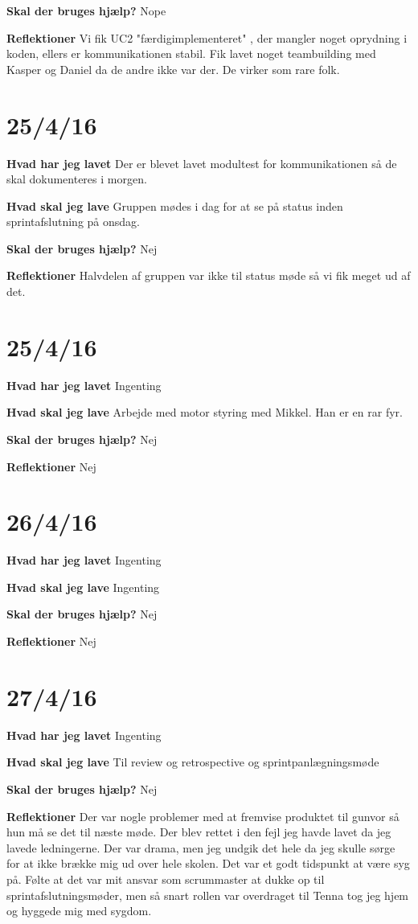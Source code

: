 \documentclass{article}
\begin{document}
	\textbf{Skal der bruges hjælp?}
	Nope
	
	\textbf{Reflektioner}
	Vi fik UC2 "færdigimplementeret" , der mangler noget oprydning i koden, ellers er kommunikationen stabil. Fik lavet noget teambuilding med Kasper og Daniel da de andre ikke var der. De virker som rare folk. 
	
	\section{25/4/16}
	\textbf{Hvad har jeg lavet}
	Der er blevet lavet modultest for kommunikationen så de skal dokumenteres i morgen. 
	
	\textbf{Hvad skal jeg lave}
	Gruppen mødes i dag for at se på status inden sprintafslutning på onsdag. 
	
	\textbf{Skal der bruges hjælp?}
	Nej

	
	\textbf{Reflektioner}
	Halvdelen af gruppen var ikke til status møde så vi fik meget ud af det.
	
	\section{25/4/16}
	\textbf{Hvad har jeg lavet}
	Ingenting
	
	\textbf{Hvad skal jeg lave}
	Arbejde med motor styring med Mikkel. Han er en rar fyr. 
	
	\textbf{Skal der bruges hjælp?}
	Nej
	
	
	\textbf{Reflektioner}
	Nej
	
	\section{26/4/16}
	\textbf{Hvad har jeg lavet}
	Ingenting
	
	\textbf{Hvad skal jeg lave}
	Ingenting
	
	\textbf{Skal der bruges hjælp?}
	Nej
	
	
	\textbf{Reflektioner}
	Nej
	
	
	\section{27/4/16}
	\textbf{Hvad har jeg lavet}
	Ingenting
	
	\textbf{Hvad skal jeg lave}
	Til review og retrospective og sprintpanlægningsmøde
	
	\textbf{Skal der bruges hjælp?}
	Nej
	
	
	\textbf{Reflektioner}
	Der var nogle problemer med at fremvise produktet til gunvor så hun må se det til næste møde. Der blev rettet i den fejl jeg havde lavet da jeg lavede ledningerne. Der var drama, men jeg undgik det hele da jeg skulle sørge for at ikke brække mig ud over hele skolen. Det var et godt tidspunkt at være syg på. Følte at det var mit ansvar som scrummaster at dukke op til sprintafslutningsmøder, men så snart rollen var overdraget til Tenna tog jeg hjem og hyggede mig med sygdom. 
	
\end{document}
